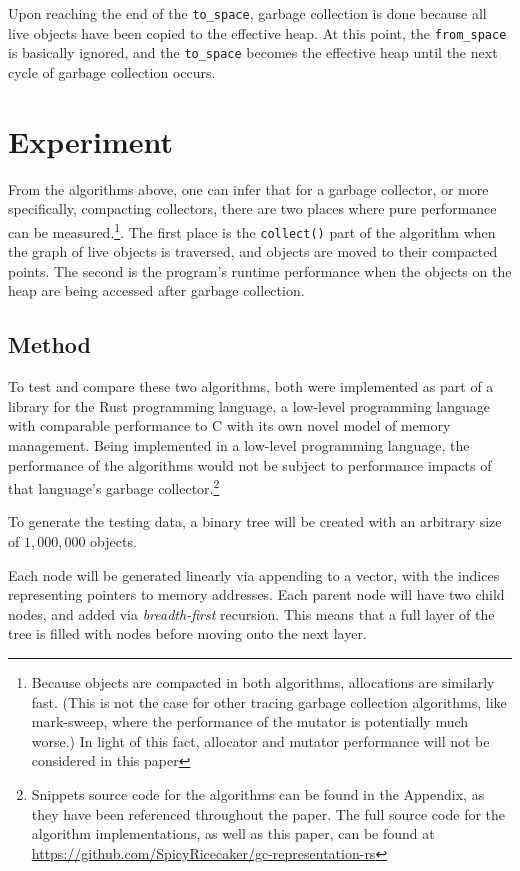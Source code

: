 \documentclass[index]{subfiles}
\begin{document}
Upon reaching the end of the \verb+to_space+, garbage collection is done because all live objects have been copied to the effective heap. At this point, the \verb+from_space+ is basically ignored, and the \verb+to_space+ becomes the effective heap until the next cycle of garbage collection occurs.

\section{Experiment}

From the algorithms above, one can infer that for a garbage collector, or more specifically, compacting collectors, there are two places where pure performance can be measured.\footnote{Because objects are compacted in both algorithms, allocations are similarly fast. (This is not the case for other tracing garbage collection algorithms, like mark-sweep, where the performance of the mutator is potentially much worse.) In light of this fact, allocator and mutator performance will not be considered in this paper}. The first place is the \verb+collect()+ part of the algorithm when the graph of live objects is traversed, and objects are moved to their compacted points. The second is the program's runtime performance when the objects on the heap are being accessed after garbage collection.

\subsection{Method}

To test and compare these two algorithms, both were implemented as part of a library for the Rust programming language, a low-level programming language with comparable performance to C with its own novel model of memory management. Being implemented in a low-level programming language, the performance of the algorithms would not be subject to performance impacts of that language's garbage collector.\footnote{Snippets source code for the algorithms can be found in the Appendix, as they have been referenced throughout the paper. The full source code for the algorithm implementations, as well as this paper, can be found at \href{https://github.com/SpicyRicecaker/gc-representation-rs}{https://github.com/SpicyRicecaker/gc-representation-rs}}

To generate the testing data, a binary tree will be created with an arbitrary size of \(1,000,000\) objects.

Each node will be generated linearly via appending to a vector, with the indices representing pointers to memory addresses. Each parent node will have two child nodes, and added via \textit{breadth-first} recursion. This means that a full layer of the tree is filled with nodes before moving onto the next layer. %
\end{document}
